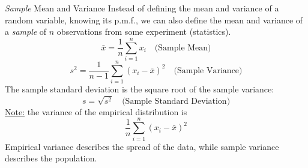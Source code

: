 ﻿\documentclass[12pt]{article}
\begin{document}
\begin{definition}{\textit{Sample} Mean and Variance}
    Instead of defining the mean and variance of a random variable, knowing its p.m.f., we can also define the mean and variance of a \textit{sample} of $n$ observations from some experiment (statistics).
    \[
\boxed{\bar{x}=\frac1n\sum_{i=1}^{n}x_i\quad \text{(Sample Mean)}}
\]
\[
\boxed{s^2=\frac{1}{n-1}\sum_{i=1}^{n}(x_i-\bar{x})^2 \quad \text{(Sample Variance)}}
\]
The sample standard deviation is the square root of the sample variance:
\[\boxed{s=\sqrt{s^2} \quad \text{(Sample Standard Deviation)}}\]
\underline{Note:} the variance of the empirical distribution is 
\[\frac{1}{n}\sum_{i=1}^{n}(x_i-\bar{x})^2\]
Empirical variance describes the spread of the data, while sample variance describes the population.
\end{definition}
\section*{}
\end{document}

